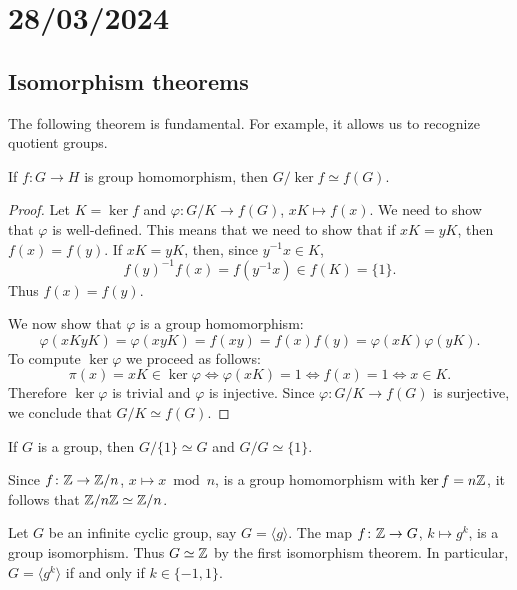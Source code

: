 \section{28/03/2024}

\subsection{Isomorphism theorems}

The following theorem is fundamental. For example, it allows us to recognize quotient groups. 

\begin{theorem}
If $f\colon G\to H$ is group homomorphism, then $G/\ker f\simeq f(G)$.
\end{theorem}

\begin{proof}
    Let $K=\ker f$ and $\varphi\colon G/K\to f(G)$, $xK\mapsto f(x)$. We need to show that $\varphi$ is well-defined. This means that
    we need to show that if $xK=yK$, then $f(x)=f(y)$. If $xK=yK$, then, since $y^{-1}x\in K$, 
    \[
        f(y)^{-1}f(x)=f(y^{-1}x)\in f(K)=\{1\}.
    \]
    Thus $f(x)=f(y)$.

    We now show that $\varphi$ is a group homomorphism: 
        \[
        \varphi(xKyK)=\varphi(xyK)=f(xy)=f(x)f(y)=\varphi(xK)\varphi(yK).
        \]
    To compute $\ker\varphi$ we proceed as follows: 
        \[
        \pi(x)=xK\in\ker\varphi\Longleftrightarrow \varphi(xK)=1
        \Longleftrightarrow f(x)=1
        \Longleftrightarrow x\in K.
        \]
    Therefore  $\ker\varphi$ is trivial and
    $\varphi$ is injective. Since $\varphi\colon G/K\to f(G)$ is surjective, 
    we conclude that $G/K\simeq f(G)$.
\end{proof}

If $G$ is a group, then $G/\{1\}\simeq G$ and $G/G\simeq\{1\}$.

\begin{example}
Since $f\colon\mathbb{Z}\to\mathbb{Z}/n$, $x\mapsto x\bmod n$, is a group homomorphism
with $\ker f=n\mathbb{Z}$, it follows that 
$\mathbb{Z}/n\mathbb{Z}\simeq\mathbb{Z}/n$.
\end{example}

\begin{example}
Let $G$ be an infinite cyclic group, say $G=\langle g\rangle$. The map 
$f \colon\mathbb{Z}\to G$, $k\mapsto g^k$,
is a group isomorphism. Thus $G\simeq\mathbb{Z}$ by the first isomorphism theorem. In particular, $G=\langle g^k\rangle$ if and only if 
 $k\in\{-1,1\}$.
\end{example}

